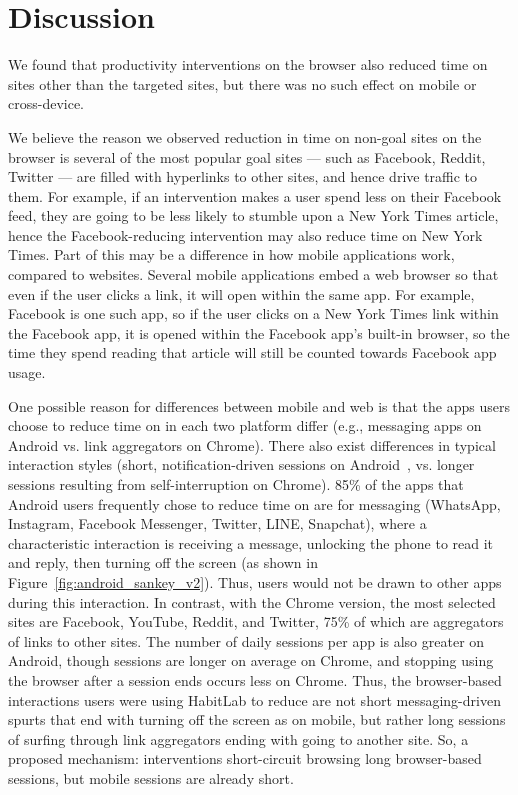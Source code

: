 \section{Discussion}

We found that productivity interventions on the browser also reduced time on sites other than the targeted sites, but there was no such effect on mobile or cross-device.

We believe the reason we observed reduction in time on non-goal sites on the browser is several of the most popular goal sites --- such as Facebook, Reddit, Twitter --- are filled with hyperlinks to other sites, and hence drive traffic to them. For example, if an intervention makes a user spend less on their Facebook feed, they are going to be less likely to stumble upon a New York Times article, hence the Facebook-reducing intervention may also reduce time on New York Times.
Part of this may be a difference in how mobile applications work, compared to websites. Several mobile applications embed a web browser so that even if the user clicks a link, it will open within the same app. For example, Facebook is one such app, so if the user clicks on a New York Times link within the Facebook app, it is opened within the Facebook app's built-in browser, so the time they spend reading that article will still be counted towards Facebook app usage.

One possible reason for differences between mobile and web is that the apps users choose to reduce time on in each two platform differ (e.g., messaging apps on Android vs. link aggregators on Chrome). 
There also exist differences in typical interaction styles (short, notification-driven sessions on Android~\cite{oulasvirta2005interaction}, vs. longer sessions resulting from self-interruption on Chrome). 85\% of the apps that Android users frequently chose to reduce time on are for messaging (WhatsApp, Instagram, Facebook Messenger, Twitter, LINE, Snapchat), where a characteristic interaction is receiving a message, unlocking the phone to read it and reply, then turning off the screen (as shown in Figure~\ref{fig:android_sankey_v2}). Thus, users would not be drawn to other apps during this interaction. In contrast, with the Chrome version, the most selected sites are Facebook, YouTube, Reddit, and Twitter, 75\% of which are aggregators of links to other sites. The number of daily sessions per app is also greater on Android, though sessions are longer on average on Chrome, and stopping using the browser after a session ends occurs less on Chrome. Thus, the browser-based interactions users were using HabitLab to reduce are not short messaging-driven spurts that end with turning off the screen as on mobile, but rather long sessions of surfing through link aggregators ending with going to another site. So, a proposed mechanism: interventions short-circuit browsing long browser-based sessions, but mobile sessions are already short. %

